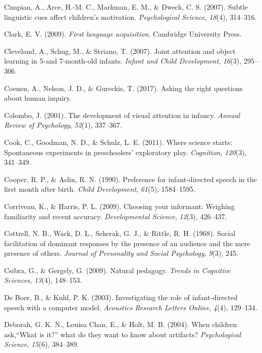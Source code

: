 \documentclass[oneside]{report}
\begin{document}
\hypertarget{ref-cimpian2007subtle}{}
Cimpian, A., Arce, H.-M. C., Markman, E. M., \& Dweck, C. S. (2007).
Subtle linguistic cues affect children's motivation. \emph{Psychological
Science}, \emph{18}(4), 314--316.

\hypertarget{ref-clark2009first}{}
Clark, E. V. (2009). \emph{First language acquisition}. Cambridge
University Press.

\hypertarget{ref-cleveland2007joint}{}
Cleveland, A., Schug, M., \& Striano, T. (2007). Joint attention and
object learning in 5-and 7-month-old infants. \emph{Infant and Child
Development}, \emph{16}(3), 295--306.

\hypertarget{ref-coenen2017asking}{}
Coenen, A., Nelson, J. D., \& Gureckis, T. (2017). Asking the right
questions about human inquiry.

\hypertarget{ref-colombo2001development}{}
Colombo, J. (2001). The development of visual attention in infancy.
\emph{Annual Review of Psychology}, \emph{52}(1), 337--367.

\hypertarget{ref-cook2011science}{}
Cook, C., Goodman, N. D., \& Schulz, L. E. (2011). Where science starts:
Spontaneous experiments in preschoolers' exploratory play.
\emph{Cognition}, \emph{120}(3), 341--349.

\hypertarget{ref-cooper1990preference}{}
Cooper, R. P., \& Aslin, R. N. (1990). Preference for infant-directed
speech in the first month after birth. \emph{Child Development},
\emph{61}(5), 1584--1595.

\hypertarget{ref-corriveau2009choosing}{}
Corriveau, K., \& Harris, P. L. (2009). Choosing your informant:
Weighing familiarity and recent accuracy. \emph{Developmental Science},
\emph{12}(3), 426--437.

\hypertarget{ref-cottrell1968social}{}
Cottrell, N. B., Wack, D. L., Sekerak, G. J., \& Rittle, R. H. (1968).
Social facilitation of dominant responses by the presence of an audience
and the mere presence of others. \emph{Journal of Personality and Social
Psychology}, \emph{9}(3), 245.

\hypertarget{ref-csibra2009natural}{}
Csibra, G., \& Gergely, G. (2009). Natural pedagogy. \emph{Trends in
Cognitive Sciences}, \emph{13}(4), 148--153.

\hypertarget{ref-de2003investigating}{}
De Boer, B., \& Kuhl, P. K. (2003). Investigating the role of
infant-directed speech with a computer model. \emph{Acoustics Research
Letters Online}, \emph{4}(4), 129--134.

\hypertarget{ref-deborah2004children}{}
Deborah, G. K. N., Louisa Chan, E., \& Holt, M. B. (2004). When children
ask,``What is it?'' what do they want to know about artifacts?
\emph{Psychological Science}, \emph{15}(6), 384--389.
\end{document}
